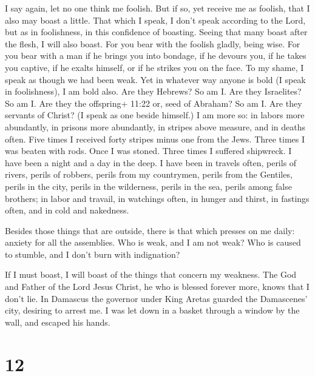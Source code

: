  I say again, let no one think me foolish. But if so, yet
receive me as foolish, that I also may boast a little. 
That which I speak, I don't speak according to the Lord, but as in
foolishness, in this confidence of boasting.  Seeing that
many boast after the flesh, I will also boast.  For you
bear with the foolish gladly, being wise.  For you bear
with a man if he brings you into bondage, if he devours you, if he takes
you captive, if he exalts himself, or if he strikes you on the face.
 To my shame, I speak as though we had been weak. Yet in
whatever way anyone is bold (I speak in foolishness), I am bold also.
 Are they Hebrews? So am I. Are they Israelites? So am I.
Are they the offspring+ 11:22 or, seed of Abraham? So am I.
 Are they servants of Christ? (I speak as one beside
himself.) I am more so: in labors more abundantly, in prisons more
abundantly, in stripes above measure, and in deaths often. 
Five times I received forty stripes minus one from the Jews.
 Three times I was beaten with rods. Once I was stoned.
Three times I suffered shipwreck. I have been a night and a day in the
deep.  I have been in travels often, perils of rivers,
perils of robbers, perils from my countrymen, perils from the Gentiles,
perils in the city, perils in the wilderness, perils in the sea, perils
among false brothers;  in labor and travail, in watchings
often, in hunger and thirst, in fastings often, and in cold and
nakedness.

 Besides those things that are outside, there is that which
presses on me daily: anxiety for all the assemblies.  Who
is weak, and I am not weak? Who is caused to stumble, and I don't burn
with indignation?

 If I must boast, I will boast of the things that concern
my weakness.  The God and Father of the Lord Jesus Christ,
he who is blessed forever more, knows that I don't lie.  In
Damascus the governor under King Aretas guarded the Damascenes' city,
desiring to arrest me.  I was let down in a basket through
a window by the wall, and escaped his hands.

\hypertarget{section-11}{%
\section{12}\label{section-11}}

